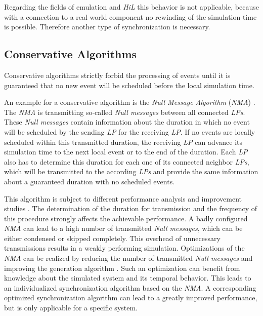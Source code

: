 Regarding the fields of emulation and \emph{HiL} this behavior is not applicable, because with a connection to a real world component no rewinding of the simulation time is possible.
Therefore another type of synchronization is necessary.
    
\subsection{Conservative Algorithms}
\label{sec:parallel_synchronization_conservative}
Conservative algorithms strictly forbid the processing of events until it is guaranteed that no new event will be scheduled before the local simulation time.

An example for a conservative algorithm is the \emph{Null Message Algorithm} (\emph{NMA}) \cite[section 2.1]{bagrodia_performance_2000}.
The \emph{NMA} is transmitting so-called \emph{Null messages} between all connected \emph{LPs}.
These \emph{Null messages} contain information about the duration in which no event will be scheduled by the sending \emph{LP} for the receiving \emph{LP}.
If no events are locally scheduled within this transmitted duration, the receiving \emph{LP} can advance its simulation time to the next local event or to the end of the duration.
Each \emph{LP} also has to determine this duration for each one of its connected neighbor \emph{LPs}, which will be transmitted to the according \emph{LPs} and provide the same information about a guaranteed duration with no scheduled events.\cite[section 3]{kumar_study_1993}

This algorithm is subject to different performance analysis and improvement studies \cite{kumar_study_1993} \cite{rizvi_reducing_2008} \cite{Varga03apractical}. 
The determination of the duration for transmission and the frequency of this procedure strongly affects the achievable performance.
A badly configured \emph{NMA} can lead to a high number of transmitted \emph{Null messages}, which can be either condensed or skipped completely.
This overhead of unnecessary transmissions results in a weakly performing simulation.
Optimizations of the \emph{NMA} can be realized by reducing the number of transmitted \emph{Null messages} and improving the generation algorithm \cite{de_vries_reducing_1990}.
Such an optimization can benefit from knowledge about the simulated system and its temporal behavior.
This leads to an individualized synchronization algorithm based on the \emph{NMA}.
A corresponding optimized synchronization algorithm can lead to a greatly improved performance, but is only applicable for a specific system.
\\

